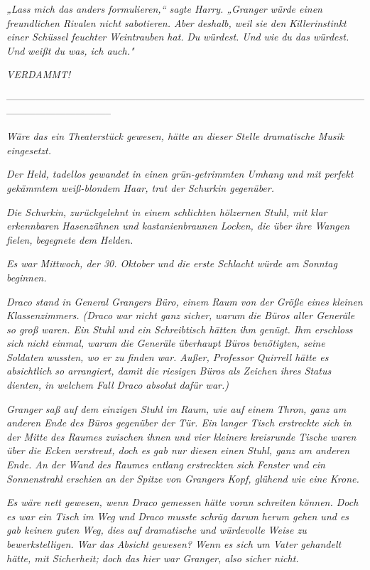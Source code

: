 {\emph{„Lass mich das anders formulieren,“ sagte Harry. „\emph{Granger}} \emph{würde einen freundlichen Rivalen nicht sabotieren. Aber deshalb, weil sie den} \emph{Killerinstinkt einer Schüssel feuchter Weintrauben hat.} \emph{\emph{Du}} \emph{würdest. Und} \emph{\emph{wie}} \emph{du das würdest. Und} \emph{weißt du was, ich auch."}

\emph{\emph{VERDAMMT!}}

--------------------------------------------------------------------------------------------------------------------------------------------

\hfill\break \emph{Wäre das ein Theaterstück gewesen, hätte} \emph{an dieser Stelle} \emph{dramatische Musik eingesetzt.}

\emph{Der Held, tadellos gewandet in einen grün-getrimmten Umhang und mit perfekt gekämmtem weiß-blondem Haar, trat der Schurkin gegenüber.}

\emph{Die Schurkin, zurückgelehnt in einem schlichten hölzernen Stuhl, mit klar erkennbaren Hasenzähnen und kastanienbraunen Locken, die über ihre Wangen fielen, begegnete dem Helden.}

\emph{Es war Mittwoch, der 30. Oktober und die erste Schlacht würde am Sonntag beginnen.}

\emph{Draco stand in General Grangers Büro, einem Raum von der Größe eines kleinen Klassenzimmers. (Draco war nicht ganz sicher,} \emph{\emph{warum}} \emph{die Büros aller Generäle so groß waren. Ein Stuhl und ein Schreibtisch hätten ihm genügt. Ihm erschloss sich nicht einmal, warum die Generäle überhaupt Büros benötigten, seine Soldaten wussten, wo er zu finden war. Außer, Professor Quirrell hätte es absichtlich so arrangiert, damit die riesigen Büros als Zeichen ihres Status dienten, in welchem Fall Draco absolut dafür war.)}

\emph{Granger saß auf dem einzigen Stuhl im Raum, wie auf einem Thron, ganz am anderen Ende des Büros gegenüber der Tür. Ein langer Tisch erstreckte sich in der Mitte des Raumes zwischen ihnen und vier kleinere kreisrunde Tische waren über die Ecken verstreut, doch es gab nur diesen einen Stuhl, ganz am anderen Ende. An der Wand des Raumes entlang erstreckten sich Fenster und ein Sonnenstrahl erschien an der Spitze von Grangers Kopf, glühend wie eine Krone.}

\emph{Es wäre nett gewesen, wenn Draco gemessen hätte voran schreiten können. Doch es war ein Tisch im Weg und Draco musste schräg darum} \emph{herum gehen und es gab keinen guten Weg, dies auf dramatische und würdevolle Weise zu bewerkstelligen. War das Absicht gewesen? Wenn es sich um Vater gehandelt hätte, mit Sicherheit; doch das hier war Granger, also sicher nicht.}

}
